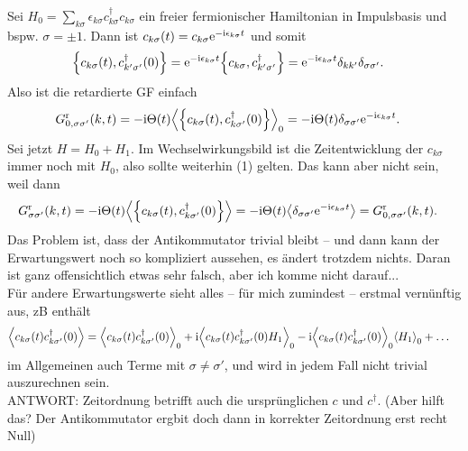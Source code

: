 \documentclass[english, parskip=full]{scrartcl}
\begin{document}

Sei $H_0=\sum_{k\sigma} \epsilon_{k\sigma} c_{k\sigma}^\dagger c_{k\sigma}$ ein freier fermionischer Hamiltonian in Impulsbasis und bspw. $\sigma = \pm 1$.
Dann ist $c_{k\sigma}(t) = c_{k\sigma} \text{e}^{-\text{i} \epsilon_{k\sigma} t}$ und somit
\begin{align}
\klc*{c_{k\sigma}(t), c_{k'\sigma'}^\dagger(0)} &= \powe{-\i \epsilon_{k\sigma} t} \klc*{c_{k\sigma}, c_{k'\sigma'}^\dagger} = \powe{-\i \epsilon_{k\sigma} t} \delta_{kk'} \delta_{\sigma\sigma'}.
\end{align}
Also ist die retardierte GF einfach
\begin{align}
G_{0,\sigma\sigma'}^\r(k,t) &= -\i\Theta(t) \bra*{\klc*{c_{k\sigma}(t), c_{k\sigma'}^\dagger(0)}}_0 = -\i\Theta(t) \delta_{\sigma\sigma'} \powe{-\i \epsilon_{k\sigma} t}. 
\end{align}
Sei jetzt $H=H_0 + H_1$.
Im Wechselwirkungsbild ist die Zeitentwicklung der $c_{k\sigma}$ immer noch mit $H_0$, also sollte weiterhin (1) gelten.
Das kann aber nicht sein, weil dann
\begin{align}
G_{\sigma\sigma'}^\r(k,t) &= -\i\Theta(t) \bra*{\klc*{c_{k\sigma}(t), c_{k\sigma'}^\dagger(0)}} = -\i\Theta(t) \bra*{\delta_{\sigma\sigma'} \powe{-\i \epsilon_{k\sigma} t}} = G_{0,\sigma\sigma'}^\r(k,t).
\end{align}
Das Problem ist, dass der Antikommutator trivial bleibt -- und dann kann der Erwartungswert noch so kompliziert aussehen, es ändert trotzdem nichts.
Daran ist ganz offensichtlich etwas sehr falsch, aber ich komme nicht darauf...\\
Für andere Erwartungswerte sieht alles -- für mich zumindest -- erstmal vernünftig aus, zB enthält
\begin{align}
\bra*{c_{k\sigma}(t) c_{k\sigma'}^\dagger(0)} &= \bra*{c_{k\sigma}(t) c_{k\sigma'}^\dagger(0)}_0 + \i \bra*{c_{k\sigma}(t) c_{k\sigma'}^\dagger(0) H_1}_0 - \i \bra*{c_{k\sigma}(t) c_{k\sigma'}^\dagger(0)}_0 \bra*{H_1}_0 + \dots
\end{align}
im Allgemeinen auch Terme mit $\sigma\neq \sigma'$, und wird in jedem Fall nicht trivial auszurechnen sein.\\
ANTWORT: Zeitordnung betrifft auch die ursprünglichen $c$ und $c^\dagger$. (Aber hilft das? Der Antikommutator ergbit doch dann in korrekter Zeitordnung erst recht Null)


\end{document}
